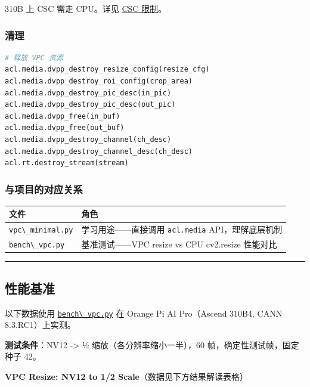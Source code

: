 310B 上 CSC 需走 CPU。详见 \hyperref[vpc-csc]{CSC 限制}。

\subsubsection{清理}\label{src-book-chapter6-h99}

\begin{lstlisting}[language=Python]
# 释放 VPC 资源
acl.media.dvpp_destroy_resize_config(resize_cfg)
acl.media.dvpp_destroy_roi_config(crop_area)
acl.media.dvpp_destroy_pic_desc(in_pic)
acl.media.dvpp_destroy_pic_desc(out_pic)
acl.media.dvpp_free(in_buf)
acl.media.dvpp_free(out_buf)
acl.media.dvpp_destroy_channel(ch_desc)
acl.media.dvpp_destroy_channel_desc(ch_desc)
acl.rt.destroy_stream(stream)
\end{lstlisting}

\subsubsection{与项目的对应关系}\label{src-book-chapter6-h100}

\begin{longtable}[]{@{}ll@{}}
\toprule\noalign{}
文件 & 角色 \\
\midrule\noalign{}
\endhead
\bottomrule\noalign{}
\endlastfoot
\passthrough{\lstinline!vpc\_minimal.py!} & 学习用途------直接调用
\passthrough{\lstinline!acl.media!} API，理解底层机制 \\
\passthrough{\lstinline!bench\_vpc.py!} & 基准测试------VPC resize vs
CPU cv2.resize 性能对比 \\
\end{longtable}

\begin{center}\rule{0.5\linewidth}{0.5pt}\end{center}

\subsection{性能基准}\label{src-book-chapter6-h101}

以下数据使用
\href{https://github.com/zhouxzh/Ascend310/blob/master/samples/chapter6/vpc/bench_vpc.py}{\passthrough{\lstinline!bench\_vpc.py!}}
在 Orange Pi AI Pro（Ascend 310B4, CANN 8.3.RC1）上实测。

\textbf{测试条件}：NV12 -\textgreater{} ½ 缩放（各分辨率缩小一半），60
帧，确定性测试帧，固定种子 42。

\textbf{VPC Resize: NV12 to 1/2 Scale}（数据见下方结果解读表格）

